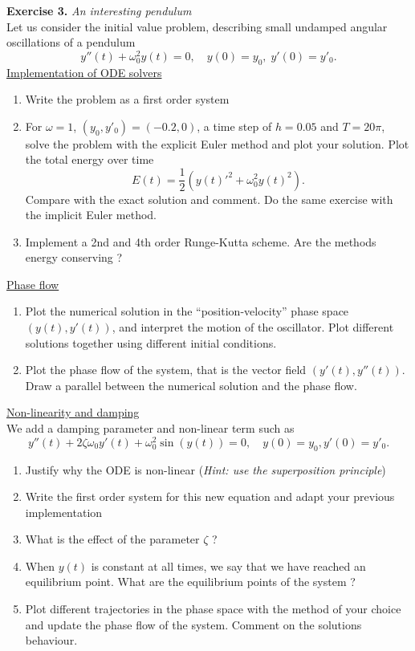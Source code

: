 \documentclass{article}
\begin{document}
\vspace{0.5cm}
\noindent \textbf{Exercise 3.} \textit{An interesting pendulum} \\
 Let us consider the initial value problem, describing small undamped angular oscillations of a pendulum
 $$ y''(t) + \omega_0^2 y(t) = 0, \quad y(0)=y_0, \; y'(0) = y'_0. $$
 \underline{Implementation of ODE solvers}
 \begin{enumerate}
     \item Write the problem as a first order system
     \item For $\omega=1$, $(y_0, y'_0) = (-0.2, 0)$, a time step of $h=0.05$ and $T=20\pi$, solve the problem with the explicit Euler method and plot your solution. Plot the total energy over time
     $$E(t) =  \frac{1}{2}\left( y(t)'^2 + \omega_0^2y(t)^2 \right). $$
     Compare with the exact solution and comment. Do the same exercise with the implicit Euler method.
     \item Implement a 2nd and 4th order Runge-Kutta scheme. Are the methods energy conserving ? 
      \end{enumerate}
      
\noindent \underline{Phase flow}
    \begin{enumerate}
    \item Plot the numerical solution in the ``position-velocity'' phase space $(y(t), y'(t))$, and interpret the motion of the oscillator. Plot different solutions together using different initial conditions.
    \item Plot the phase flow of the system, that is the vector field $(y'(t), y''(t))$. Draw a parallel between the numerical solution and the phase flow.
 \end{enumerate}
 
 \noindent \underline{Non-linearity and damping} \\
 We add a damping parameter and non-linear term such as
 $$ y''(t) + 2 \zeta \omega_0 y'(t) + \omega_0^2 \sin(y(t)) = 0, \quad y(0)=y_0, y'(0) = y'_0. $$
 \begin{enumerate}
     \item Justify why the ODE is non-linear (\textit{Hint: use the superposition principle})
     \item Write the first order system for this new equation and adapt your previous implementation
     \item What is the effect of the parameter $\zeta$ ?
     \item When $y(t)$ is constant at all times, we say that we have reached an equilibrium point. What are the equilibrium points of the system ?
     \item Plot different trajectories in the phase space with the method of your choice and update the phase flow of the system. Comment on the solutions behaviour.
 \end{enumerate}
\end{document}
